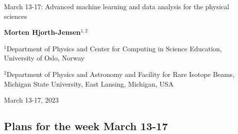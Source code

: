 \documentclass[%
oneside,                 %
final,                   %
10pt]{article}
\begin{document}

\newcommand{\exercisesection}[1]{\subsection*{#1}}






\thispagestyle{empty}

\begin{center}
{\LARGE\bf
\begin{spacing}{1.25}
March 13-17: Advanced machine learning and data analysis for the physical sciences
\end{spacing}
}
\end{center}


\begin{center}
{\bf Morten Hjorth-Jensen${}^{1, 2}$} \\ [0mm]
\end{center}

\begin{center}
\centerline{{\small ${}^1$Department of Physics and Center for Computing in Science Education, University of Oslo, Norway}}
\centerline{{\small ${}^2$Department of Physics and Astronomy and Facility for Rare Isotope Beams, Michigan State University, East Lansing, Michigan, USA}}
\end{center}
    

\begin{center}
March 13-17, 2023
\end{center}

\vspace{1cm}


\subsection*{Plans for the week March 13-17}


\paragraph{}
\end{document}
